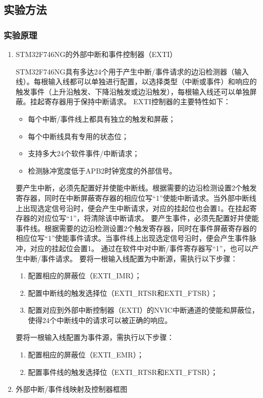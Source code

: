 ﻿\documentclass[UTF8,12pt]{article}
\begin{document}
\subsection{实验方法}
\subsubsection{实验原理}
\begin{enumerate}
  \item STM32F746NG的外部中断和事件控制器（EXTI）
  
  STM32F746NG具有多达24个用于产生中断/事件请求的边沿检测器（输入线）。每根输入线都可以单独进行配置，以选择类型（中断或事件）和响应的触发事件（上升沿触发、下降沿触发或边沿触发），每根输入线还可以单独屏蔽。挂起寄存器用于保持中断请求。
  EXTI控制器的主要特性如下：
  \begin{itemize}
    \item 每个中断/事件线上都具有独立的触发和屏蔽；
    \item 每个中断线具有专用的状态位；
    \item 支持多大24个软件事件/中断请求；
    \item 检测脉冲宽度低于APB2时钟宽度的外部信号。
  \end{itemize}
  要产生中断，必须先配置好并使能中断线。根据需要的边沿检测设置2个触发寄存器，同时在中断屏蔽寄存器的相应位写“1”使能中断请求。当外部中断线上出现选定信号沿时，便会产生中断请求，对应的挂起位也会置1。在挂起寄存器的对应位写“1”，将清除该中断请求。
  要产生事件，必须先配置好并使能事件线。根据需要的边沿检测设置2个触发寄存器，同时在事件屏蔽寄存器的相应位写“1”使能事件请求。当事件线上出现选定信号沿时，便会产生事件脉冲，对应的挂起位会置1。
  通过在软件中对中断/事件寄存器写“1”，也可以产生中断/事件请求。
  要将一根输入线配置为中断源，需执行以下步骤：
  \begin{enumerate}
    \item 配置相应的屏蔽位（EXTI\_IMR）；
    \item 配置中断线的触发选择位（EXTI\_RTSR和EXTI\_FTSR）；
    \item 配置对应到外部中断控制器（EXTI）的NVIC中断通道的使能和屏蔽位，使得24个中断线中的请求可以被正确的响应。
  \end{enumerate}
  要将一根输入线配置为事件源，需执行以下步骤：
  \begin{enumerate}
    \item 配置相应的屏蔽位（EXTI\_EMR）；
    \item 配置事件线的触发选择位（EXTI\_RTSR和EXTI\_FTSR）；
  \end{enumerate}
  \item 外部中断/事件线映射及控制器框图
  

\end{enumerate}
\end{document}
